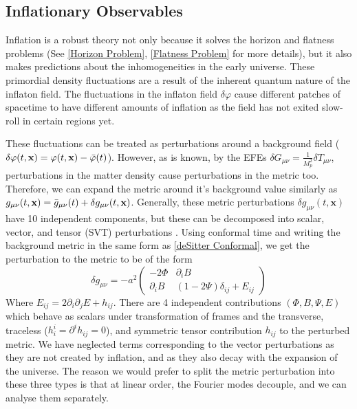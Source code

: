 \documentclass[aps,prd,reprint,preprintnumbers,showpacs,floatfix,nofootinbib,superscript address]{revtex4-2}
\begin{document}
\subsection{Inflationary Observables}  \label{Inflationary Observables}
Inflation is a robust theory not only because it solves the horizon and flatness problems (See \cref{Horizon Problem}, \cref{Flatness Problem} for more details), but it also makes predictions about the inhomogeneities in the early universe. These primordial density fluctuations are a result of the inherent quantum nature of the inflaton field. 
The fluctuations in the inflaton field $\delta\varphi$ cause different patches of spacetime to have different amounts of inflation as the field has not exited slow-roll in certain regions yet. 

These fluctuations can be treated as perturbations around a background field ($\delta\varphi(t,\textbf{x}) = \varphi(t,\textbf{x}) - \Bar{\varphi}(t)$). However, as is known, by the EFEs $\delta G_{\mu\nu} = \frac{1}{M_p^2}\delta T_{\mu \nu}$, perturbations in the matter density cause perturbations in the metric too. Therefore, we can expand the metric around it's background value similarly as $g_{\mu\nu}(t,\textbf{x}) = \Bar{g}_{\mu\nu}(t) + \delta g_{\mu\nu}(t,\textbf{x})$. Generally, these metric perturbations $\delta g_{\mu\nu}(t,\textbf{x})$ have 10 independent components, but these can be decomposed into scalar, vector, and tensor (SVT) perturbations \cite{liddle_cosmological_2000, malik_cosmological_2009}. Using conformal time and writing the background metric in the same form as \cref{deSitter Conformal}, we get the perturbation to the metric to be of the form
\begin{equation} \label{Perturbed metric}
    \delta g_{\mu\nu}
    = 
    -a^2
    \begin{pmatrix}
        -2 \Phi & \partial_iB \\
        \partial_iB & (1-2\Psi)\delta_{ij} + E_{ij} 
    \end{pmatrix}
\end{equation}
Where $E_{ij} = 2\partial_i\partial_j E + h_{ij}$. There are 4 independent contributions $(\Phi, B, \Psi, E)$ which behave as scalars under transformation of frames and the transverse, traceless ($h_i^i = \partial^ih_{ij} = 0$), and symmetric tensor contribution $h_{ij}$ to the perturbed metric. We have neglected terms corresponding to the vector perturbations as they are not created by inflation, and as they also decay with the expansion of the universe. The reason we would prefer to split the metric perturbation into these three types is that at linear order, the Fourier modes decouple, and we can analyse them separately. 
\end{document}
